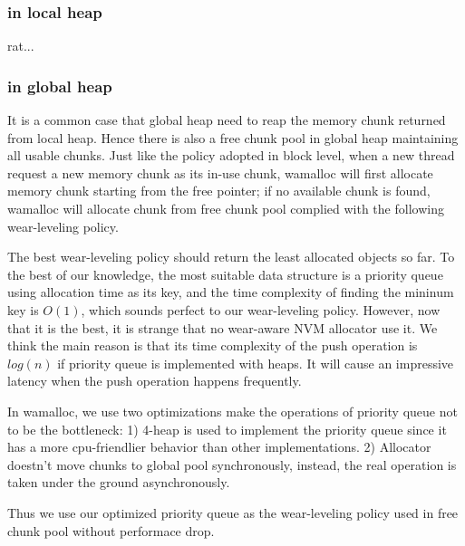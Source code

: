 \documentclass{vldb}
\begin{document}
\subsubsection{in local heap}

rat...

\subsubsection{in global heap}
It is a common case that global heap need to reap the memory chunk returned from local heap.
Hence there is also a free chunk pool in global heap maintaining all usable chunks. 
Just like the policy adopted in block level, 
when a new thread request a new memory chunk as its in-use chunk,
wamalloc will first allocate memory chunk starting from the free pointer; 
if no available chunk is found, wamalloc will allocate chunk from free chunk pool complied with the following wear-leveling policy.

The best wear-leveling policy should return the least allocated objects so far. 
To the best of our knowledge, the most suitable data structure is a priority queue using allocation time as its key,
and the time complexity of finding the mininum key is $O(1)$, which sounds perfect to our wear-leveling policy.
However, now that it is the best, it is strange that no wear-aware NVM allocator use it.
We think the main reason is that its time complexity of the push operation is $log(n)$ if priority queue is implemented with heaps. 
It will cause an impressive latency when the push operation happens frequently.

In wamalloc, we use two optimizations make the operations of priority queue not to be the bottleneck:
1) 4-heap is used to implement the priority queue since it has a more cpu-friendlier behavior than other implementations.
2) Allocator doestn't move chunks to global pool synchronously, instead, the real operation is taken under the ground asynchronously.

Thus we use our optimized priority queue as the wear-leveling policy used in free chunk pool without performace drop.
\end{document}
